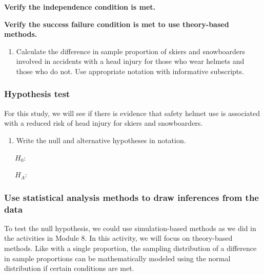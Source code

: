 \documentclass[
]{report}
\providecommand{\tightlist}{%
  \setlength{\itemsep}{0pt}\setlength{\parskip}{0pt}}
\begin{document}
\textbf{Verify the independence condition is met.}

\vspace{0.6in}

\textbf{Verify the success failure condition is met to use theory-based methods.}

\vspace{1in}

\begin{enumerate}
\def\labelenumi{\arabic{enumi}.}
\tightlist
\item
  Calculate the difference in sample proportion of skiers and snowboarders involved in accidents with a head injury for those who wear helmets and those who do not. Use appropriate notation with informative subscripts.
\end{enumerate}

\vspace{0.8in}

\subsubsection*{Hypothesis test}\label{hypothesis-test-2}

For this study, we will see if there is evidence that safety helmet use is associated with a
reduced risk of head injury for skiers and snowboarders.

\begin{enumerate}
\def\labelenumi{\arabic{enumi}.}
\setcounter{enumi}{1}
\tightlist
\item
  Write the null and alternative hypotheses in notation.
\end{enumerate}

~~~\(H_0\):

\vspace{0.2in}

~~~\(H_A\):

\vspace{0.2in}

\subsubsection*{Use statistical analysis methods to draw inferences from the data}\label{use-statistical-analysis-methods-to-draw-inferences-from-the-data-3}

To test the null hypothesis, we could use simulation-based methods as we did in the activities in Module 8. In this activity, we will focus on theory-based methods. Like with a single proportion, the sampling distribution of a difference in sample proportions can be mathematically modeled using the normal distribution if certain conditions are met.
\end{document}
